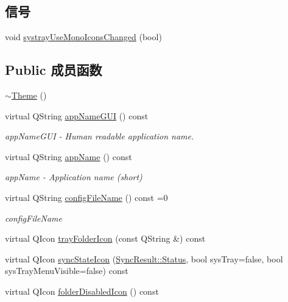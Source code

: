 \subsection*{信号}
\begin{DoxyCompactItemize}
\item 
void \hyperlink{class_o_c_c_1_1_theme_a58f89be5e4c25fdaaa828800c2549a61}{systray\+Use\+Mono\+Icons\+Changed} (bool)
\end{DoxyCompactItemize}
\subsection*{Public 成员函数}
\begin{DoxyCompactItemize}
\item 
\hyperlink{class_o_c_c_1_1_theme_a50cac7916dfd7ccd8de36ca932b18168}{$\sim$\+Theme} ()
\item 
virtual Q\+String \hyperlink{class_o_c_c_1_1_theme_a65e92dc2b2dff6e39fe2e0362dbe6327}{app\+Name\+G\+UI} () const
\begin{DoxyCompactList}\small\item\em app\+Name\+G\+UI -\/ Human readable application name. \end{DoxyCompactList}\item 
virtual Q\+String \hyperlink{class_o_c_c_1_1_theme_a08bc5c6b79f6680e58c4b3eebe7cad77}{app\+Name} () const
\begin{DoxyCompactList}\small\item\em app\+Name -\/ Application name (short) \end{DoxyCompactList}\item 
virtual Q\+String \hyperlink{class_o_c_c_1_1_theme_a998943bafbde46e6eb606876d06a003c}{config\+File\+Name} () const =0
\begin{DoxyCompactList}\small\item\em config\+File\+Name \end{DoxyCompactList}\item 
virtual Q\+Icon \hyperlink{class_o_c_c_1_1_theme_ab4b9822667ab5ba98fd2ce9786282ab7}{tray\+Folder\+Icon} (const Q\+String \&) const
\item 
virtual Q\+Icon \hyperlink{class_o_c_c_1_1_theme_ad4cf5d68c39eba2fe56bb7d5b6da54fc}{sync\+State\+Icon} (\hyperlink{class_o_c_c_1_1_sync_result_a4f4487ea8c462f2ec90c43bce6df1d1e}{Sync\+Result\+::\+Status}, bool sys\+Tray=false, bool sys\+Tray\+Menu\+Visible=false) const
\item 
virtual Q\+Icon \hyperlink{class_o_c_c_1_1_theme_a540552aeb95babaa8baa41facbfac31c}{folder\+Disabled\+Icon} () const

\end{DoxyCompactItemize}
